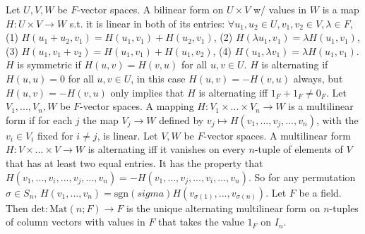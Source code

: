 Let $U, V, W$ be $F$-vector spaces.
A bilinear form on $U \times V$ w/ values in $W$ is a map $H : U \times V \to W$ s.t.
it is linear in both of its entries:
$\forall u_1, u_2 \in U, v_1, v_2 \in V, \lambda \in F$,
(1) $H(u_1 + u_2, v_1) = H(u_1, v_1) + H(u_2, v_1)$,
(2) $H(\lambda u_1, v_1) = \lambda H(u_1, v_1)$,
(3) $H(u_1, v_1 + v_2) = H(u_1, v_1) + H(u_1, v_2)$,
(4) $H(u_1, \lambda v_1) = \lambda H(u_1, v_1)$.
$H$ is symmetric if $H(u, v) = H(v, u)$ for all $u, v \in U$.
$H$ is alternating if $H(u,u) = 0$ for all $u, v \in U$,
in this case $H(u, v) = -H(v, u)$ always,
but $H(u, v) = -H(v, u)$ only implies that $H$ is alternating iff $1_F + 1_F \neq 0_F$.
Let $V_1, ..., V_n, W$ be $F$-vector spaces.
A mapping $H: V_1 \times ... \times V_n \to W$ is a multilinear form if
for each $j$ the map $V_j \to W$
defined by $v_j \mapsto H(v_1, ..., v_j, ..., v_n)$,
with the $v_i \in V_i$ fixed for $i \neq j$, is linear.
 Let $V, W$ be $F$-vector spaces.
A multilinear form $H : V \times ... \times V \to W$ is alternating iff
it vanishes on every $n$-tuple of elements of $V$ that has at least two equal entries.
It has the property that $H(v_1, ..., v_i, ..., v_j, ..., v_n) = -H(v_1, ..., v_j, ..., v_i, ..., v_n)$.
So for any permutation $\sigma \in S_n$,
$H(v_1, ..., v_n) = \text{sgn}(sigma) H(v_{\sigma(1)}, ..., v_{\sigma(n)})$.
Let $F$ be a field.
Then $\text{det} : \text{Mat}(n; F) \to F$ is the unique alternating multilinear form
on $n$-tuples of column vectors with values in $F$
that takes the value $1_F$ on $I_n$.